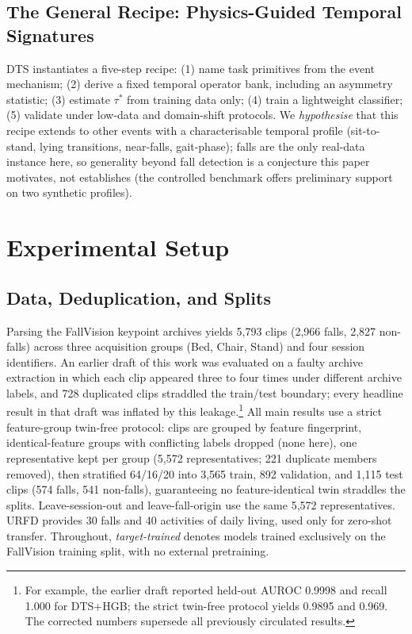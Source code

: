 \subsection{The General Recipe: Physics-Guided Temporal Signatures}
DTS instantiates a five-step recipe: (1) name task primitives from the event mechanism; (2) derive a fixed temporal operator bank, including an asymmetry statistic; (3) estimate $\tau^{*}$ from training data only; (4) train a lightweight classifier; (5) validate under low-data and domain-shift protocols. We \emph{hypothesise} that this recipe extends to other events with a characterisable temporal profile (sit-to-stand, lying transitions, near-falls, gait-phase); falls are the only real-data instance here, so generality beyond fall detection is a conjecture this paper motivates, not establishes (the controlled benchmark offers preliminary support on two synthetic profiles).

\section{Experimental Setup}
\subsection{Data, Deduplication, and Splits}
Parsing the FallVision keypoint archives yields 5,793 clips (2,966 falls, 2,827 non-falls) across three acquisition groups (Bed, Chair, Stand) and four session identifiers. An earlier draft of this work was evaluated on a faulty archive extraction in which each clip appeared three to four times under different archive labels, and 728 duplicated clips straddled the train/test boundary; every headline result in that draft was inflated by this leakage.\footnote{For example, the earlier draft reported held-out AUROC 0.9998 and recall 1.000 for DTS+HGB; the strict twin-free protocol yields 0.9895 and 0.969. The corrected numbers supersede all previously circulated results.} All main results use a strict feature-group twin-free protocol: clips are grouped by feature fingerprint, identical-feature groups with conflicting labels dropped (none here), one representative kept per group (5,572 representatives; 221 duplicate members removed), then stratified 64/16/20 into 3,565 train, 892 validation, and 1,115 test clips (574 falls, 541 non-falls), guaranteeing no feature-identical twin straddles the splits. Leave-session-out and leave-fall-origin use the same 5,572 representatives. URFD \citep{kwolek2014urfd} provides 30 falls and 40 activities of daily living, used only for zero-shot transfer. Throughout, \emph{target-trained} denotes models trained exclusively on the FallVision training split, with no external pretraining.

